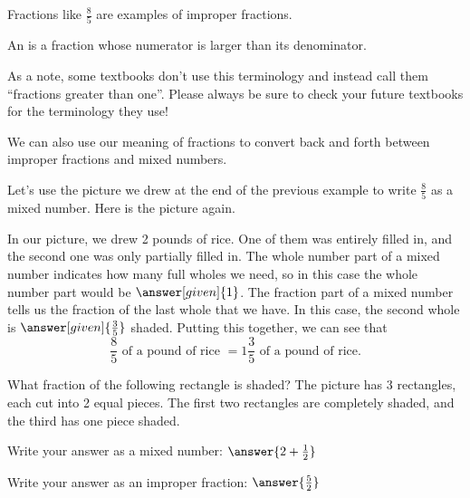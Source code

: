 \documentclass{ximera}
\begin{document}
Fractions like $\frac{8}{5}$ are examples of improper fractions.

\begin{definition}
An  is a fraction whose numerator is larger than its denominator.
\end{definition}

As a note, some textbooks don't use this terminology and instead call them ``fractions greater than one''. Please always be sure to check your future textbooks for the terminology they use! 

We can also use our meaning of fractions to convert back and forth between improper fractions and mixed numbers.

\begin{example}
Let's use the picture we drew at the end of the previous example to write $\frac{8}{5}$ as a mixed number. Here is the picture again.

\begin{image} \end{image}

In our picture, we drew 2 pounds of rice. One of them was entirely filled in, and the second one was only partially filled in. The whole number part of a mixed number indicates how many full wholes we need, so in this case the whole number part would be $\answer[given]{1}$. The fraction part of a mixed number tells us the fraction of the last whole that we have. In this case, the second whole is $\answer[given]{\frac{3}{5}}$ shaded. Putting this together, we can see that 
\[
\frac{8}{5} \textrm{ of a pound of rice } = 1 \frac{3}{5} \textrm{ of a pound of rice.}
\]

\end{example}

\begin{question}
What fraction of the following rectangle is shaded? The picture has 3 rectangles, each cut into 2 equal pieces. The first two rectangles are completely shaded, and the third has one piece shaded.

\begin{image}\end{image}

Write your answer as a mixed number: $\answer{2+\frac{1}{2}}$

Write your answer as an improper fraction: $\answer{\frac{5}{2}}$
\end{question}
\end{document}
